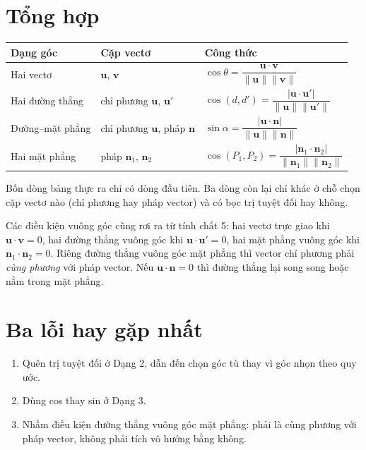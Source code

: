 \documentclass[12pt,a4paper]{article}
\begin{document}
\section{Tổng hợp}

\begin{center}
\begin{tabular}{|l|l|l|}
\hline
\textbf{Dạng góc} & \textbf{Cặp vectơ} & \textbf{Công thức} \\
\hline
Hai vectơ & $\mathbf{u}$, $\mathbf{v}$ & $\cos\theta = \dfrac{\mathbf{u}\cdot\mathbf{v}}{\|\mathbf{u}\|\|\mathbf{v}\|}$ \\
\hline
Hai đường thẳng & chỉ phương $\mathbf{u}$, $\mathbf{u}'$ & $\cos(d,d') = \dfrac{|\mathbf{u}\cdot\mathbf{u}'|}{\|\mathbf{u}\|\|\mathbf{u}'\|}$ \\
\hline
Đường--mặt phẳng & chỉ phương $\mathbf{u}$, pháp $\mathbf{n}$ & $\sin\alpha = \dfrac{|\mathbf{u}\cdot\mathbf{n}|}{\|\mathbf{u}\|\|\mathbf{n}\|}$ \\
\hline
Hai mặt phẳng & pháp $\mathbf{n}_1$, $\mathbf{n}_2$ & $\cos(P_1,P_2) = \dfrac{|\mathbf{n}_1\cdot\mathbf{n}_2|}{\|\mathbf{n}_1\|\|\mathbf{n}_2\|}$ \\
\hline
\end{tabular}
\end{center}

Bốn dòng bảng thực ra chỉ có dòng đầu tiên. Ba dòng còn lại chỉ khác ở chỗ chọn cặp vectơ nào (chỉ phương hay pháp vector) và có bọc trị tuyệt đối hay không.

Các điều kiện vuông góc cũng rơi ra từ tính chất 5: hai vectơ trực giao khi $\mathbf{u}\cdot\mathbf{v}=0$, hai đường thẳng vuông góc khi $\mathbf{u}\cdot\mathbf{u}'=0$, hai mặt phẳng vuông góc khi $\mathbf{n}_1\cdot\mathbf{n}_2=0$. Riêng đường thẳng vuông góc mặt phẳng thì vector chỉ phương phải \emph{cùng phương} với pháp vector. Nếu $\mathbf{u}\cdot\mathbf{n}=0$ thì đường thẳng lại song song hoặc nằm trong mặt phẳng.

\section{Ba lỗi hay gặp nhất}

\begin{enumerate}
  \item Quên trị tuyệt đối ở Dạng 2, dẫn đến chọn góc tù thay vì góc nhọn theo quy ước.
  \item Dùng cos thay sin ở Dạng 3.
  \item Nhầm điều kiện đường thẳng vuông góc mặt phẳng: phải là cùng phương với pháp vector, không phải tích vô hướng bằng không.
\end{enumerate}
\end{document}
